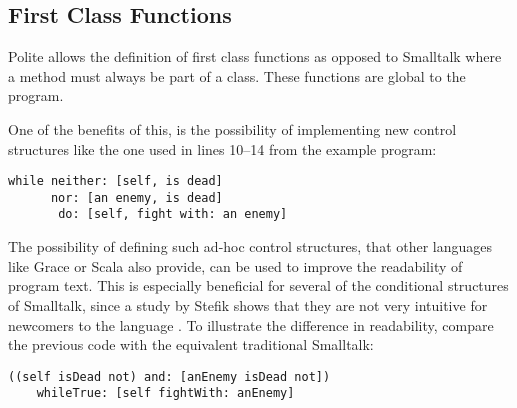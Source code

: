 \subsection {First Class Functions}
Polite allows the definition of first class functions as opposed to Smalltalk where a method must always be part of a class. These functions are global to the program. 

One of the benefits of this, is the possibility of implementing new control structures like the one used in lines 10--14 from the example program: 

\begin{verbatim}
while neither: [self, is dead] 
	  nor: [an enemy, is dead] 
	   do: [self, fight with: an enemy] 
\end{verbatim}

The possibility of defining such ad-hoc control structures, that other languages like Grace or Scala also provide, can be used to improve the readability of program text. This is especially beneficial for several of the conditional structures of Smalltalk, since a study by Stefik shows that they are not very intuitive for newcomers to the language \cite{Stef13}. To illustrate the difference in readability, compare the previous code with the equivalent traditional Smalltalk: 

\begin{verbatim}
((self isDead not) and: [anEnemy isDead not]) 
	whileTrue: [self fightWith: anEnemy]
\end{verbatim}




